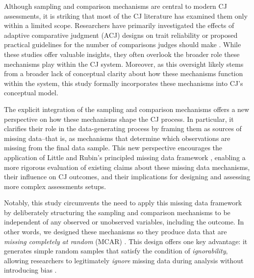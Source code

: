\documentclass[
  authoryear,
  review,
  1p]{elsarticle}
\begin{document}
Although sampling and comparison mechanisms are central to modern CJ
assessments, it is striking that most of the CJ literature has examined
them only within a limited scope. Researchers have primarily
investigated the effects of adaptive comparative judgment (ACJ) designs
on trait reliability
\citep{Pollitt_2012a, Pollitt_2012b, Bramley_2015, Verhavert_et_al_2022, Mikhailiuk_et_al_2021, Gray_et_al_2024}
or proposed practical guidelines for the number of comparisons judges
should make \citep{Verhavert_et_al_2019, Crompvoets_et_al_2022}. While
these studies offer valuable insights, they often overlook the broader
role these mechanisms play within the CJ system. Moreover, as this
oversight likely stems from a broader lack of conceptual clarity about
how these mechanisms function within the system, this study formally
incorporates these mechanisms into CJ's conceptual model.

The explicit integration of the sampling and comparison mechanisms
offers a new perspective on how these mechanisms shape the CJ process.
In particular, it clarifies their role in the data-generating process by
framing them as sources of missing data--that is, as mechanisms that
determine which observations are missing from the final data sample.
This new perspective encourages the application of Little and Rubin's
principled missing data framework \citeyearpar{Little_et_al_2020},
enabling a more rigorous evaluation of existing claims about these
missing data mechanisms, their influence on CJ outcomes, and their
implications for designing and assessing more complex assessments
setups.

Notably, this study circumvents the need to apply this missing data
framework by deliberately structuring the sampling and comparison
mechanisms to be independent of any observed or unobserved variables,
including the outcome. In other words, we designed these mechanisms so
they produce data that are \emph{missing completely at random} (MCAR)
\citep{Little_et_al_2020}. This design offers one key advantage: it
generates simple random samples that satisfy the condition of
\emph{ignorability}, allowing researchers to legitimately \emph{ignore}
missing data during analysis without introducing bias
\citep{Everitt_et_al_2010, Kohler_et_al_2019, Neal_2020}.
\end{document}
